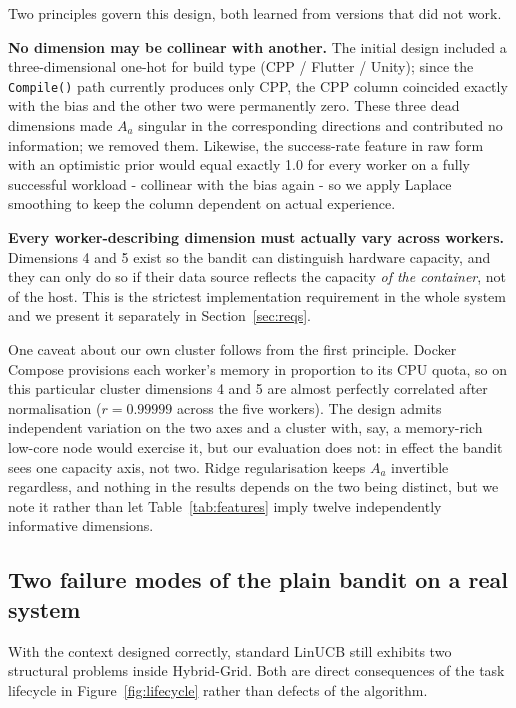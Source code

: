 \documentclass[final,5p,times,twocolumn]{elsarticle}
\begin{document}
Two principles govern this design, both learned from versions that did not work.

\textbf{No dimension may be collinear with another.} The initial design included a three-dimensional one-hot for build type (CPP / Flutter / Unity); since the \texttt{Compile()} path currently produces only CPP, the CPP column coincided exactly with the bias and the other two were permanently zero. These three dead dimensions made $A_a$ singular in the corresponding directions and contributed no information; we removed them. Likewise, the success-rate feature in raw form with an optimistic prior would equal exactly 1.0 for every worker on a fully successful workload - collinear with the bias again - so we apply Laplace smoothing to keep the column dependent on actual experience.

\textbf{Every worker-describing dimension must actually vary across workers.} Dimensions 4 and 5 exist so the bandit can distinguish hardware capacity, and they can only do so if their data source reflects the capacity \emph{of the container}, not of the host. This is the strictest implementation requirement in the whole system and we present it separately in Section~\ref{sec:reqs}.

One caveat about our own cluster follows from the first principle. Docker Compose provisions each worker's memory in proportion to its CPU quota, so on this particular cluster dimensions 4 and 5 are almost perfectly correlated after normalisation ($r=0.99999$ across the five workers). The design admits independent variation on the two axes and a cluster with, say, a memory-rich low-core node would exercise it, but our evaluation does not: in effect the bandit sees one capacity axis, not two. Ridge regularisation keeps $A_a$ invertible regardless, and nothing in the results depends on the two being distinct, but we note it rather than let Table~\ref{tab:features} imply twelve independently informative dimensions.

\subsection{Two failure modes of the plain bandit on a real system}
\label{sec:failures}

With the context designed correctly, standard LinUCB still exhibits two structural problems inside Hybrid-Grid. Both are direct consequences of the task lifecycle in Figure~\ref{fig:lifecycle} rather than defects of the algorithm.
\end{document}
